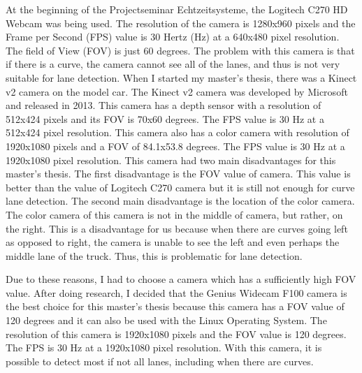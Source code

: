 At the beginning of the Projectseminar Echtzeitsysteme, the Logitech C270 HD Webcam was being used. The resolution of 
the camera is 1280x960 pixels and the Frame per Second (FPS) value is 30 Hertz (Hz) at a 640x480 pixel resolution. 
The field of View (FOV) is just 60 degrees. The problem with this camera is that if there is a curve, the camera 
cannot see all of the lanes, and thus is not very suitable for lane detection. When I started my master's thesis, there 
was a Kinect v2 camera on the model car.  The Kinect v2 camera was developed by Microsoft and released in 2013. This 
camera has a depth sensor with a resolution of 512x424 pixels and its FOV is 70x60 degrees. The FPS value is 30 Hz at 
a 512x424 pixel resolution. This camera also has a color camera with resolution of 1920x1080 pixels and a FOV of 
84.1x53.8 degrees. The FPS value is 30 Hz at a 1920x1080 pixel resolution. This camera had two main disadvantages for 
this master's thesis. The first disadvantage is the FOV value of camera. This value is better than the value of Logitech 
C270 camera but it is still not enough for curve lane detection. The second main disadvantage is the location of the 
color camera. The color camera of this camera is not in the middle of camera, but rather, on the right. This is a 
disadvantage for us because when there are curves going left as opposed to right, the camera is unable to see the 
left and even perhaps the middle lane of the truck. Thus, this is problematic for lane detection.

Due to these reasons, I had to choose a camera which has a sufficiently high FOV value. After doing research, I decided 
that the Genius Widecam F100 camera is the best choice for this master's thesis because this camera has a FOV value of 
120 degrees and it can also be used with the Linux Operating System. The resolution of this camera is 1920x1080 pixels 
and the FOV value is 120 degrees. The FPS is 30 Hz at a 1920x1080 pixel resolution. With this camera, it is possible 
to detect most if not all lanes, including when there are curves. 

